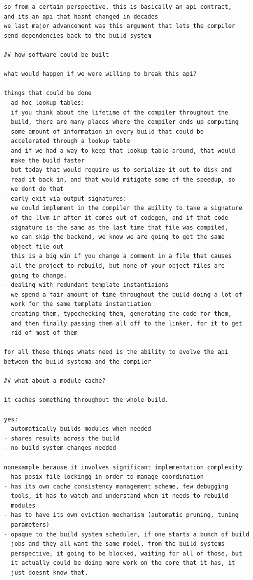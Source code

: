 \documentclass[12pt, a4paper]{report}
\begin{document}
\begin{Verbatim}[fontsize=\small]
so from a certain perspective, this is basically an api contract,
and its an api that hasnt changed in decades
we last major advancement was this argument that lets the compiler
send dependencies back to the build system

## how software could be built

what would happen if we were willing to break this api?

things that could be done
- ad hoc lookup tables:
  if you think about the lifetime of the compiler throughout the
  build, there are many places where the compiler ends up computing
  some amount of information in every build that could be
  accelerated through a lookup table
  and if we had a way to keep that lookup table around, that would
  make the build faster
  but today that would require us to serialize it out to disk and
  read it back in, and that would mitigate some of the speedup, so
  we dont do that
- early exit via output signatures:
  we could implement in the compiler the ability to take a signature
  of the llvm ir after it comes out of codegen, and if that code
  signature is the same as the last time that file was compiled,
  we can skip the backend, we know we are going to get the same
  object file out
  this is a big win if you change a comment in a file that causes
  all the project to rebuild, but none of your object files are
  going to change.
- dealing with redundant template instantiaions
  we spend a fair amount of time throughout the build doing a lot of
  work for the same template instantiation
  creating them, typechecking them, generating the code for them,
  and then finally passing them all off to the linker, for it to get
  rid of most of them

for all these things whats need is the ability to evolve the api
between the build systema and the compiler

## what about a module cache?

it caches something throughout the whole build.

yes:
- automatically builds modules when needed
- shares results across the build
- no build system changes needed

nonexample because it involves significant implementation complexity
- has posix file lockingg in order to manage coordination
- has its own cache consistency management scheme, few debugging
  tools, it has to watch and understand when it needs to rebuild
  modules
- has to have its own eviction mechanism (automatic pruning, tuning
  parameters)
- opaque to the build system scheduler, if one starts a bunch of build
  jobs and they all want the same model, from the build systems
  perspective, it going to be blocked, waiting for all of those, but
  it actually could be doing more work on the core that it has, it
  just doesnt know that.


\end{Verbatim}
\end{document}
